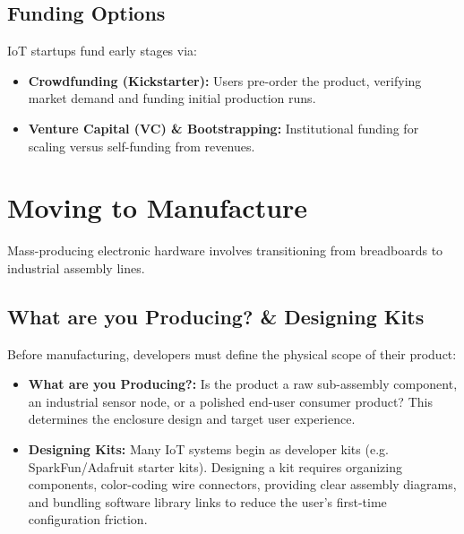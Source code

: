 \documentclass[12pt,a4paper]{article}
\begin{document}
\subsection{Funding Options}
IoT startups fund early stages via:
\begin{itemize}[leftmargin=*, itemsep=2pt]
  \item \textbf{Crowdfunding (Kickstarter):} Users pre-order the product, verifying market demand and funding initial production runs.
  \item \textbf{Venture Capital (VC) \& Bootstrapping:} Institutional funding for scaling versus self-funding from revenues.
\end{itemize}

\section{Moving to Manufacture}

Mass-producing electronic hardware involves transitioning from breadboards to industrial assembly lines.

\subsection{What are you Producing? \& Designing Kits}
Before manufacturing, developers must define the physical scope of their product:
\begin{itemize}[leftmargin=*, itemsep=3.0pt]
  \item \textbf{What are you Producing?:} Is the product a raw sub-assembly component, an industrial sensor node, or a polished end-user consumer product? This determines the enclosure design and target user experience.
  \item \textbf{Designing Kits:} Many IoT systems begin as developer kits (e.g. SparkFun/Adafruit starter kits). Designing a kit requires organizing components, color-coding wire connectors, providing clear assembly diagrams, and bundling software library links to reduce the user's first-time configuration friction.
\end{itemize}
\end{document}
